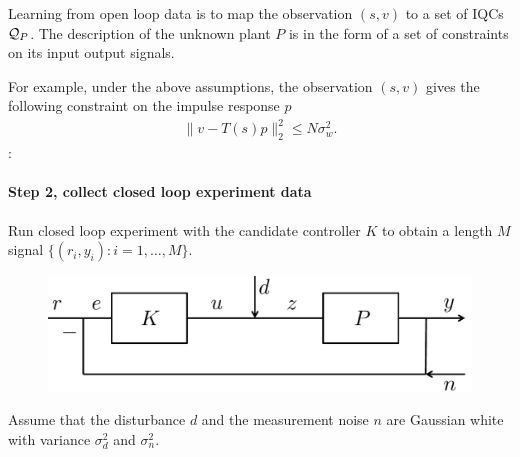 \documentclass[11pt, onecolumn]{article}
\newcommand{\rb}[1]{{\color{red}{Ross: #1}}}
\theoremstyle{plain}
\theoremstyle{plain}
\theoremstyle{definition}
\begin{document}
\begin{definition}
  Learning from open loop data is to map the observation $(s,v)$ to a set of IQCs $\mathcal Q_P$.  The
  description of the unknown plant $P$ is in the form of a set of constraints on its input output
  signals.


  For example, under the above assumptions, the observation $(s,v)$ gives the following constraint
  on the impulse response $p$
  \begin{align*}
    \|v - T(s) p \|_2^2 \le N \sigma_w^2.
  \end{align*}
  \rb{Doesn't this only hold in expectation/WHP? The constraint is fine, but it
    doesn't ``follow from the assumption''.}:


\end{definition}

\paragraph{Step 2,  collect closed  loop experiment data}
Run closed loop experiment with the candidate controller $K$ to obtain a length $M$ signal
$\{(r_i,y_i) : i=1,\dots, M\}$.
\begin{figure}[!ht]
  \centering
  \includegraphics[width=.5\linewidth]{sys2.pdf}
\end{figure}

\begin{assumption}
  Assume that the disturbance $d$ and the measurement noise $n$ are Gaussian white with variance
  $\sigma_d^2$ and $\sigma_n^2$.
\end{assumption}
\end{document}
